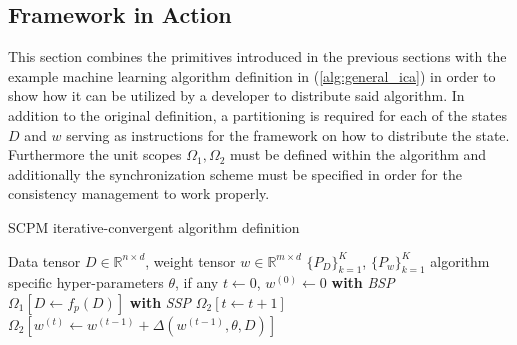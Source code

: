 \subsection{Framework in Action}
This section combines the primitives introduced in the previous sections with the example machine learning algorithm definition in (\ref{alg:general_ica}) in order to show how it can be utilized by a developer to distribute said algorithm.
In addition to the original definition, a partitioning is required for each of the states $D$ and $w$ serving as instructions for the framework on how to distribute the state.
Furthermore the unit scopes $\Omega_1, \Omega_2$ must be defined within the algorithm and additionally the synchronization scheme must be specified in order for the consistency management to work properly.
\begin{algorithm}
\caption{SCPM iterative-convergent algorithm definition}\label{alg:scpm_ica}
\begin{algorithmic}[1]{}
\ALGSTATE Data tensor $D \in \mathbb{R}^{n \times d}$, weight tensor $w \in \mathbb{R}^{m \times d}$
\PARTITIONING $\{P_D\}_{k=1}^K$, $\{P_w\}_{k=1}^K$
\INPUT algorithm specific hyper-parameters $\theta$, if any
\INIT $t \gets 0$, $w^{(0)} \gets 0$
\State \textbf{with} \textit{BSP}
\State \hspace{\algorithmicindent} $\Omega_1[D \gets f_{p}(D)]$
\Repeat
\State \textbf{with} \textit{SSP}
\State \hspace{\algorithmicindent} $\Omega_2[t \gets t + 1]$
\State \hspace{\algorithmicindent} $\Omega_2[w^{(t)} \gets w^{(t-1)} + \Delta(w^{(t-1)}, \theta, D)]$
\end{algorithmic}
\end{algorithm}


